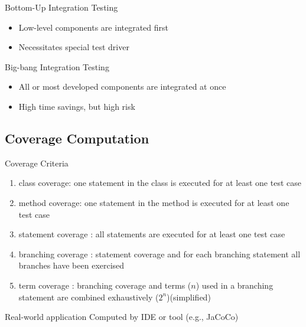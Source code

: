 \begin{frame}{\insertsubsection}
\begin{fancycolumns}[animation=none]
		\begin{definition}{Bottom-Up Integration Testing}
			\begin{itemize}
				\item Low-level components are integrated first
				\item Necessitates special test driver
			\end{itemize}
		\end{definition} 
		\begin{definition}{Big-bang Integration Testing}
			\begin{itemize}
				\item All or most developed components are integrated at once
				\item High time savings, but high risk
			\end{itemize}
		\end{definition} 
	\end{fancycolumns}
\end{frame}

\subsection{Coverage Computation}
\begin{frame}{\insertsubsection}
	\begin{fancycolumns}[animation=none]
		\begin{definition}{Coverage Criteria \mysource{\ludewiglichter}} %
			\begin{enumerate}
				\item class coverage: one statement in the class is executed for at least one test case
				\item method coverage: one statement in the method is executed for at least one test case
				\item statement coverage : all statements are executed for at least one test case
				\item branching coverage : statement coverage and for each branching statement all branches have been exercised
				\item term coverage : branching coverage and terms ($n$) used in a branching statement are combined exhaustively ($2^n$)\hfill(simplified)
			\end{enumerate}
		\end{definition} \pause
		\nextcolumn
		\begin{note}{Real-world application}
			Computed by IDE or tool (e.g., JaCoCo)
		\end{note}
	\end{fancycolumns}
\end{frame}



